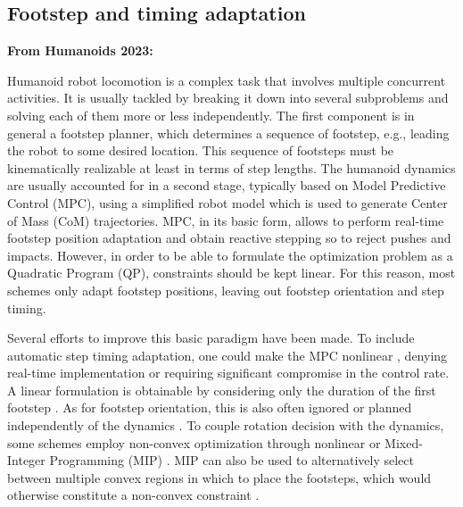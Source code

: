 \subsection{Footstep and timing adaptation}
\textbf{From Humanoids 2023:}

Humanoid robot locomotion is a complex task that involves multiple concurrent activities. It is usually tackled by breaking it down into several subproblems and solving each of them more or less independently. The first component is in general a footstep planner, which determines a sequence of footstep, e.g., leading the robot to some desired location. This sequence of footsteps must be kinematically realizable at least in terms of step lengths. The humanoid dynamics are usually accounted for in a second stage, typically based on Model Predictive Control (MPC), using a simplified robot model which is used to generate Center of Mass (CoM) trajectories. MPC, in its basic form, allows to perform real-time footstep position adaptation \cite{Herdt2010IROS} and obtain reactive stepping so to  reject pushes and impacts. However, in order to be able to formulate the optimization problem as a Quadratic Program (QP), constraints should be kept linear. For this reason, most schemes only adapt footstep positions, leaving out footstep orientation and step timing.

Several efforts to improve this basic paradigm have been made. To include automatic step timing adaptation, one could make the MPC nonlinear \cite{Maximo2020MIQPAutomaticWalking,Bohorquez2017AdaptiveStepDuration,Caron2017Whentomakeastep,Aurelien2014IROS}, denying real-time implementation or requiring significant compromise in the control rate. A linear formulation is obtainable by considering only the duration of the first footstep \cite{Smaldone2021FeasibilityDrivenSTA,Khadiv2020StepTimingAdaptation}. As for footstep orientation, this is also often ignored or planned independently of the dynamics \cite{Herdt2010IROS}. To couple rotation decision with the dynamics, some schemes employ non-convex optimization through nonlinear \cite{Naveau2017RAL,Bohorquez2018AdaptiveStepRotation} or Mixed-Integer Programming (MIP) \cite{Maximo2020MIQPAutomaticWalking}. MIP can also be used to alternatively select between multiple convex regions in which to place the footsteps, which would otherwise constitute a non-convex constraint \cite{Aceituno2018RAL,Deits2014FootstepPlanningMIQCQP}.


